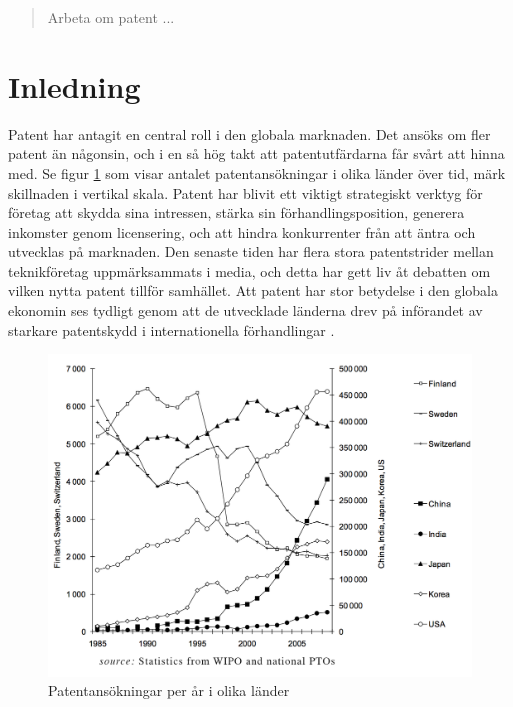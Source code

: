 
\begin{abstract}
	Arbeta om patent ...
\end{abstract}	
	
	
\section{Inledning}

Patent har antagit en central roll i den globala marknaden.
Det ansöks om fler patent än någonsin, och i en så hög takt att patentutfärdarna
får svårt att hinna med. Se figur \ref{fig:holg} som visar antalet patentansökningar i olika länder över tid, märk skillnaden i vertikal skala.
Patent har blivit ett viktigt strategiskt verktyg för företag att skydda sina
intressen, stärka sin förhandlingsposition, generera inkomster genom
licensering, och att hindra konkurrenter från att äntra och utvecklas på
marknaden. 
Den senaste tiden har flera stora patentstrider mellan teknikföretag
uppmärksammats i media, och detta har gett liv åt debatten om vilken nytta
patent tillför samhället.
Att patent har stor betydelse i den globala ekonomin ses tydligt genom att
de utvecklade länderna drev på införandet av starkare patentskydd i
internationella förhandlingar \cite{ove}. 


\begin{figure}[h!]
  \centering
  \includegraphics[width=1.15\textwidth]{../holg.png}
  
  \caption{Patentansökningar per år i olika länder\cite{holg}}
  \label{fig:holg}
\end{figure}



